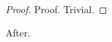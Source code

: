 \documentclass{article}
\begin{document}
\begin{proof}{Proof.} Trivial. \end{proof}
After.
\end{document}
